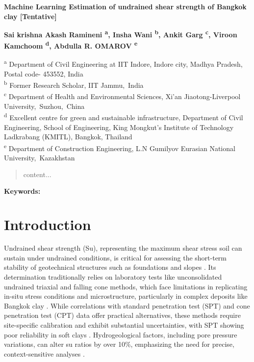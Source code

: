 \documentclass[12pt,a4paper]{article}
\begin{document}
	\linenumbers
	
	\begin{justify}
		\textbf{\Large
			Machine Learning Estimation of undrained shear strength of Bangkok clay [Tentative] 
		}
	\end{justify}
	
	\begin{flushleft}
		\textbf{Sai krishna Akash Ramineni \textsuperscript{a}, Insha Wani \textsuperscript{b}, Ankit Garg \textsuperscript{c}, Viroon Kamchoom \textsuperscript{d}, Abdulla R. OMAROV \textsuperscript{e}}
	\end{flushleft}
	
	\begin{flushleft}
		{\small {\textsuperscript{a} Department of Civil Engineering at IIT Indore, Indore city, Madhya Pradesh, Postal code- 453552, India \\
				\textsuperscript{b} Former Research Scholar, IIT Jammu, India \\ 
				\textsuperscript{c} Department of Health and Environmental Sciences, Xi'an Jiaotong-Liverpool University, Suzhou, China \\
				\textsuperscript{d} Excellent centre for green and sustainable infrastructure, Department of Civil Engineering, School of Engineering, King Mongkut's Institute of Technology Ladkrabang (KMITL), Bangkok, Thailand \\
				\textsuperscript{e} Department of Construction Engineering, L.N Gumilyov Eurasian National University, Kazakhstan \\

		}}
	\end{flushleft}
	
	\begin{abstract}
		content...
	\end{abstract}
	
	\hspace{0.4cm} \textbf{Keywords:} 
	
	\section{Introduction}
	
	Undrained shear strength (Su), representing the maximum shear stress soil can sustain under undrained conditions, is critical for assessing the short-term stability of geotechnical structures such as foundations and slopes \cite{doi:10.1680/geot.1984.34.4.449}. Its determination traditionally relies on laboratory tests like unconsolidated undrained triaxial and falling cone methods, which face limitations in replicating in-situ stress conditions and microstructure, particularly in complex deposits like Bangkok clay \cite{doi:10.1680/geot.1984.34.4.449,10.1520/GTJ20170127}. While correlations with standard penetration test (SPT) and cone penetration test (CPT) data offer practical alternatives, these methods require site-specific calibration and exhibit substantial uncertainties, with SPT showing poor reliability in soft clays \cite{10.1520/GTJ20170127,ma15186385,Sepúlveda28052025}. Hydrogeological factors, including pore pressure variations, can alter su ratios by over 10\%, emphasizing the need for precise, context-sensitive analyses \cite{belcavello2024influence}.
	
\end{document}
